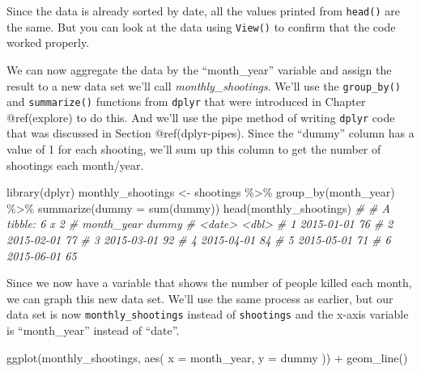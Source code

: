 \documentclass[
  a4paper,
]{krantz}
\makeatletter
\newenvironment{Shaded}{\begin{snugshade}}{\end{snugshade}}
\newcommand{\AttributeTok}[1]{\textcolor[rgb]{0.77,0.63,0.00}{#1}}
\newcommand{\CommentTok}[1]{\textcolor[rgb]{0.56,0.35,0.01}{\textit{#1}}}
\newcommand{\FunctionTok}[1]{\textcolor[rgb]{0.00,0.00,0.00}{#1}}
\newcommand{\NormalTok}[1]{#1}
\newcommand{\OtherTok}[1]{\textcolor[rgb]{0.56,0.35,0.01}{#1}}
\newcommand{\SpecialCharTok}[1]{\textcolor[rgb]{0.00,0.00,0.00}{#1}}
\newenvironment{kframe}{%
\medskip{}
\setlength{\fboxsep}{.8em}
 \def\at@end@of@kframe{}%
 \ifinner\ifhmode%
  \def\at@end@of@kframe{\end{minipage}}%
  \begin{minipage}{\columnwidth}%
 \fi\fi%
 \def\FrameCommand##1{\hskip\@totalleftmargin \hskip-\fboxsep
 \colorbox{shadecolor}{##1}\hskip-\fboxsep
     \hskip-\linewidth \hskip-\@totalleftmargin \hskip\columnwidth}%
 \MakeFramed {\advance\hsize-\width
   \@totalleftmargin\z@ \linewidth\hsize
   \@setminipage}}%
 {\par\unskip\endMakeFramed%
 \at@end@of@kframe}
\renewenvironment{Shaded}{\begin{kframe}}{\end{kframe}}
\makeatother
\begin{document}
Since the data is already sorted by date, all the values
printed from \texttt{head()} are the same. But you can look
at the data using \texttt{View()} to confirm that the code
worked properly.

We can now aggregate the data by the ``month\_year''
variable and assign the result to a new data set we'll call
\emph{monthly\_shootings}. We'll use the
\texttt{group\_by()} and \texttt{summarize()} functions from
\texttt{dplyr} that were introduced in Chapter @ref(explore)
to do this. And we'll use the pipe method of writing
\texttt{dplyr} code that was discussed in Section
@ref(dplyr-pipes). Since the ``dummy'' column has a value of
1 for each shooting, we'll sum up this column to get the
number of shootings each month/year.

\begin{Shaded}
\begin{Highlighting}[]
\FunctionTok{library}\NormalTok{(dplyr)}
\NormalTok{monthly\_shootings }\OtherTok{\textless{}{-}}\NormalTok{ shootings }\SpecialCharTok{\%\textgreater{}\%}
  \FunctionTok{group\_by}\NormalTok{(month\_year) }\SpecialCharTok{\%\textgreater{}\%}
  \FunctionTok{summarize}\NormalTok{(}\AttributeTok{dummy =} \FunctionTok{sum}\NormalTok{(dummy))}
\FunctionTok{head}\NormalTok{(monthly\_shootings)}
\CommentTok{\# \# A tibble: 6 x 2}
\CommentTok{\#   month\_year dummy}
\CommentTok{\#   \textless{}date\textgreater{}     \textless{}dbl\textgreater{}}
\CommentTok{\# 1 2015{-}01{-}01    76}
\CommentTok{\# 2 2015{-}02{-}01    77}
\CommentTok{\# 3 2015{-}03{-}01    92}
\CommentTok{\# 4 2015{-}04{-}01    84}
\CommentTok{\# 5 2015{-}05{-}01    71}
\CommentTok{\# 6 2015{-}06{-}01    65}
\end{Highlighting}
\end{Shaded}

Since we now have a variable that shows the number of people
killed each month, we can graph this new data set. We'll use
the same process as earlier, but our data set is now
\texttt{monthly\_shootings} instead of \texttt{shootings}
and the x-axis variable is ``month\_year'' instead of
``date''.

\begin{Shaded}
\begin{Highlighting}[]
\FunctionTok{ggplot}\NormalTok{(monthly\_shootings, }\FunctionTok{aes}\NormalTok{(}
  \AttributeTok{x =}\NormalTok{ month\_year,}
  \AttributeTok{y =}\NormalTok{ dummy}
\NormalTok{)) }\SpecialCharTok{+}
  \FunctionTok{geom\_line}\NormalTok{()}
\end{Highlighting}
\end{Shaded}
\end{document}
